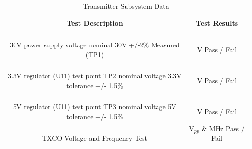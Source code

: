 \documentclass[12pt]{article}
\begin{document}
\begin{appendices}
\begin{table}[h!]
\centering
\caption*{Transmitter Subsystem Data}
\begin{tabular}{ | c | c | }
\hline
\textbf{Test Description} & \textbf{Test Results} \\
\hline
\parbox{0.5\linewidth}{\raggedright \hfill \\[-0.25 em]
30V power supply voltage nominal 30V +/-2\% Measured (TP1) \hfill \\[0.1 em]
} &  \parbox{0.4\linewidth}{\raggedright \hfill \\ [0.7 em]
\underline{\hspace{0.625in}}
 V 
\hspace{0.125 in}Pass \space / \space  Fail \hfill \\ [0.3 em]
} \\
\hline
\parbox{0.5\linewidth}{\raggedright \hfill \\[-0.25 em]
3.3V regulator (U11) test point TP2 nominal voltage 3.3V  tolerance +/- 1.5\% \hfill \\[0.1 em]
} &  \parbox{0.4\linewidth}{\raggedright \hfill \\ [0.7 em]
\underline{\hspace{0.625in}} V  \hspace{0.125 in}Pass \space / \space  Fail \hfill \\ [0.3 em]
} \\
\hline
\parbox{0.5\linewidth}{\raggedright \hfill \\[-0.25 em]
5V regulator (U11) test point TP3 nominal voltage 5V  tolerance +/- 1.5\% \hfill \\[0.1 em]
} &  \parbox{0.4\linewidth}{\raggedright \hfill \\ [0.7 em]\underline{\hspace{0.625in}}
 V  
\hspace{0.125 in}Pass \space / \space  Fail \hfill \\ [0.3 em]
} \\ 
\hline
\parbox{0.5\linewidth}{\raggedright \hfill \\[-0.25 em]
TXCO Voltage and Frequency Test
\hfill \\[0.1 em]} &  \parbox{0.4\linewidth}{\centering \hfill \\ [0.7 em]\underline{\hspace{0.275in}} 
 V$_{pp}$ \& 
\underline{\hspace{0.275in}} 
 MHz
\hspace{0.0725 in}Pass \space / \space  Fail \hfill \\ [0.3 em]} \\ 

\end{tabular}
\end{table}
\end{appendices}
\end{document}
